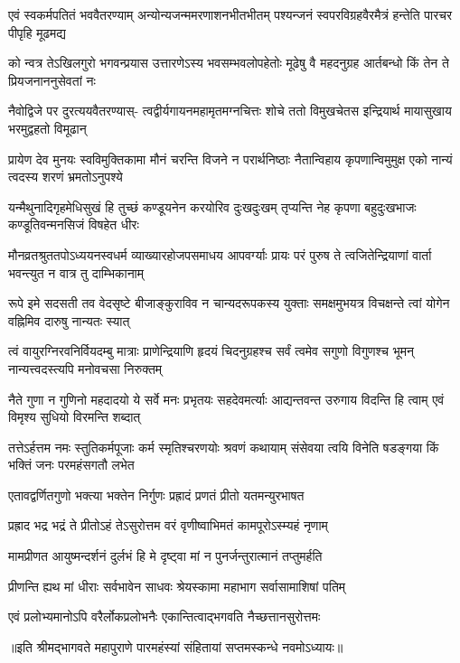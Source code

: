 \fourlineindentedshloka
{एवं स्वकर्मपतितं भववैतरण्याम्}
{अन्योन्यजन्ममरणाशनभीतभीतम्}
{पश्यन्जनं स्वपरविग्रहवैरमैत्रं}
{हन्तेति पारचर पीपृहि मूढमद्य} %

\fourlineindentedshloka
{को न्वत्र तेऽखिलगुरो भगवन्प्रयास}
{उत्तारणेऽस्य भवसम्भवलोपहेतोः}
{मूढेषु वै महदनुग्रह आर्तबन्धो}
{किं तेन ते प्रियजनाननुसेवतां नः} %

\fourlineindentedshloka
{नैवोद्विजे पर दुरत्ययवैतरण्यास्-}
{त्वद्वीर्यगायनमहामृतमग्नचित्तः}
{शोचे ततो विमुखचेतस इन्द्रियार्थ}
{मायासुखाय भरमुद्वहतो विमूढान्} %

\fourlineindentedshloka
{प्रायेण देव मुनयः स्वविमुक्तिकामा}
{मौनं चरन्ति विजने न परार्थनिष्ठाः}
{नैतान्विहाय कृपणान्विमुमुक्ष एको}
{नान्यं त्वदस्य शरणं भ्रमतोऽनुपश्ये} %

\fourlineindentedshloka
{यन्मैथुनादिगृहमेधिसुखं हि तुच्छं}
{कण्डूयनेन करयोरिव दुःखदुःखम्}
{तृप्यन्ति नेह कृपणा बहुदुःखभाजः}
{कण्डूतिवन्मनसिजं विषहेत धीरः} %

\fourlineindentedshloka
{मौनव्रतश्रुततपोऽध्ययनस्वधर्म}
{व्याख्यारहोजपसमाधय आपवर्ग्याः}
{प्रायः परं पुरुष ते त्वजितेन्द्रियाणां}
{वार्ता भवन्त्युत न वात्र तु दाम्भिकानाम्} %

\fourlineindentedshloka
{रूपे इमे सदसती तव वेदसृष्टे}
{बीजाङ्कुराविव न चान्यदरूपकस्य}
{युक्ताः समक्षमुभयत्र विचक्षन्ते त्वां}
{योगेन वह्निमिव दारुषु नान्यतः स्यात्} %

\fourlineindentedshloka
{त्वं वायुरग्निरवनिर्वियदम्बु मात्राः}
{प्राणेन्द्रियाणि हृदयं चिदनुग्रहश्च}
{सर्वं त्वमेव सगुणो विगुणश्च भूमन्}
{नान्यत्त्वदस्त्यपि मनोवचसा निरुक्तम्} %

\fourlineindentedshloka
{नैते गुणा न गुणिनो महदादयो ये}
{सर्वे मनः प्रभृतयः सहदेवमर्त्याः}
{आद्यन्तवन्त उरुगाय विदन्ति हि त्वाम्}
{एवं विमृश्य सुधियो विरमन्ति शब्दात्} %

\fourlineindentedshloka
{तत्तेऽर्हत्तम नमः स्तुतिकर्मपूजाः}
{कर्म स्मृतिश्चरणयोः श्रवणं कथायाम्}
{संसेवया त्वयि विनेति षडङ्गया किं}
{भक्तिं जनः परमहंसगतौ लभेत} %



\twolineshloka
{एतावद्वर्णितगुणो भक्त्या भक्तेन निर्गुणः}
{प्रह्रादं प्रणतं प्रीतो यतमन्युरभाषत} %



\twolineshloka
{प्रह्राद भद्र भद्रं ते प्रीतोऽहं तेऽसुरोत्तम}
{वरं वृणीष्वाभिमतं कामपूरोऽस्म्यहं नृणाम्} %

\twolineshloka
{मामप्रीणत आयुष्मन्दर्शनं दुर्लभं हि मे}
{दृष्ट्वा मां न पुनर्जन्तुरात्मानं तप्तुमर्हति} %

\twolineshloka
{प्रीणन्ति ह्यथ मां धीराः सर्वभावेन साधवः}
{श्रेयस्कामा महाभाग सर्वासामाशिषां पतिम्} %


\twolineshloka
{एवं प्रलोभ्यमानोऽपि वरैर्लोकप्रलोभनैः}
{एकान्तित्वाद्भगवति नैच्छत्तानसुरोत्तमः} %

॥इति श्रीमद्भागवते महापुराणे पारमहंस्यां संहितायां सप्तमस्कन्धे नवमोऽध्यायः॥

